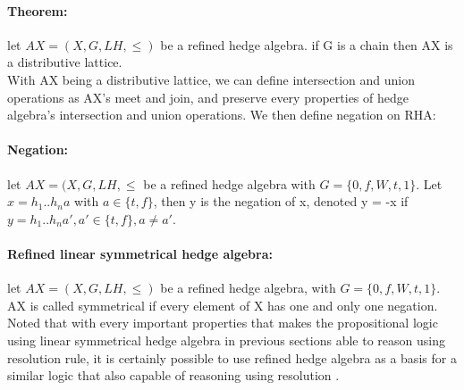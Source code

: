\documentclass[26pt,fleqn,]{article}
\begin{document}
\paragraph{Theorem: } let \(AX = (X,G,LH,\le)\) be a refined hedge algebra. if G is a chain then AX is
a distributive lattice.\\
With AX being a distributive lattice, we can define intersection and union operations as AX's meet and 
join, and preserve every properties of hedge algebra's intersection and union operations. We then define
negation on RHA:\\
\paragraph{Negation: } let \(AX = (X,G,LH,\le\) be a refined hedge algebra with \(G = \{
0,f,W,t,1\}\). Let \(x = h_1..h_n a\) with \(a \in \{t,f\}\), then y is the negation of x, denoted 
y = -x if \(y = h_1..h_n a', a' \in \{t,f\}, a \neq a'\).\\
\paragraph{Refined linear symmetrical hedge algebra: } let \(AX = (X,G,LH,\le)\) be a refined hedge
algebra, with \(G = \{0,f,W,t,1\}\). AX is called symmetrical if every element of X has one and only one
 negation.\\
Noted that with every important properties that makes the propositional logic using linear symmetrical
hedge algebra in previous sections able to reason using resolution rule, it is certainly possible to 
use refined hedge algebra as a basis for a similar logic that also capable of reasoning using resolution
.\\\\

\end{document}
